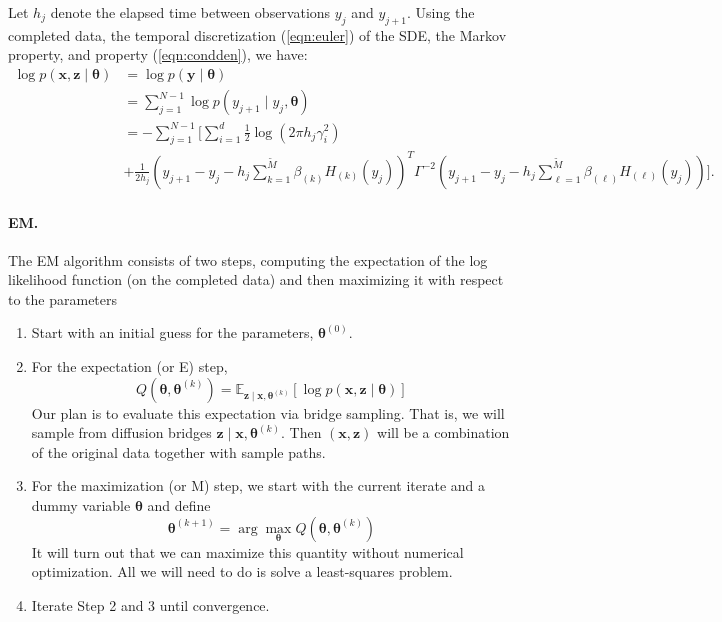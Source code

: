 \documentclass{article}
\newcommand{\btheta}{\ensuremath{\bm{\theta}}}
\newcommand{\bx}{\ensuremath{\mathbf{x}}}
\newcommand{\by}{\ensuremath{\mathbf{y}}}
\newcommand{\bz}{\ensuremath{\mathbf{z}}}
\begin{document}
Let $h_j$ denote the elapsed time between observations $y_j$ and $y_{j+1}$.  Using the completed data, the temporal discretization (\ref{eqn:euler}) of the SDE, the Markov property, and property (\ref{eqn:condden}), we have:
\begin{align*}
\log p(\bx, \bz \mid \btheta) &= \log p(\by \mid \btheta) \\
 &= \sum_{j=1}^{N-1} \log p(y_{j+1} \mid y_j, \btheta) \\
 &= -\sum_{j=1}^{N-1} \Biggl[ \sum_{i=1}^d \frac{1}{2} \log(2 \pi h_j \gamma_i^2) \\
 &+ \frac{1}{2h_j} (y_{j+1} - y_j - h_j \sum_{k=1}^{\widetilde{M}} \beta_{(k)} H_{(k)}(y_j))^T \Gamma^{-2} (y_{j+1} - y_j - h_j \sum_{\ell=1}^{\widetilde{M}} \beta_{(\ell)} H_{(\ell)}(y_j)) \Biggr].
\end{align*}

\paragraph{EM.} The EM algorithm consists of two steps, computing the expectation of the log likelihood function (on the completed data) and then maximizing it with respect to the parameters 
\begin{enumerate}
\item Start with an initial guess for the parameters, $\btheta^{(0)}$.
\item For the expectation (or E) step,
\begin{equation}
\label{eqn:expectation}
Q(\btheta, \btheta^{(k)}) = \mathbb{E}_{\bz \mid \bx, \btheta^{(k)}} [\log p(\bx, \bz \mid \btheta)]
\end{equation}
Our plan is to evaluate this expectation via bridge sampling.  That is, we will sample from diffusion bridges $\bz \mid \bx, \btheta^{(k)}$.  Then $(\bx, \bz)$ will be a combination of the original data together with sample paths.
\item For the maximization (or M) step, we start with the current iterate and a dummy variable $\btheta$ and define
\begin{equation}
\label{eqn:maximization}
\btheta^{(k+1)} = \arg \max_{\btheta} Q(\btheta, \btheta^{(k)})
\end{equation}
It will turn out that we can maximize this quantity without numerical optimization.  All we will need to do is solve a least-squares problem.
\item Iterate Step 2 and 3 until convergence.
\end{enumerate}
\end{document}
